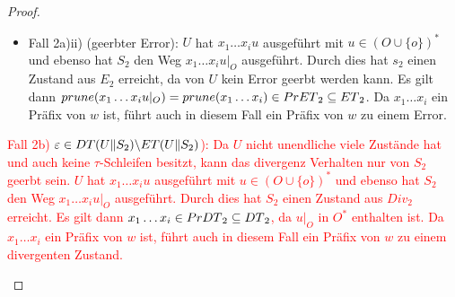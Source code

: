\begin{proof}
\begin{itemize}
\begin{itemize}
\begin{itemize}
              $q_{02} \overset{x_1\dots x_i}{\Rightarrow} q'
              \overset{x_{i+1}}{\not{\hspace{-0.1cm}\rightarrow}}$ und damit
              gilt $x_1\dots x_{i+1}\in \MIT{}_2\subseteq \ET{}_2$. Somit ist
              ein Präfix von $w$ in $\ET{}_2$ enthalten.
            \item Fall 2a)ii) (geerbter Error): $U$ hat $x_1\dots x_iu$
              ausgeführt mit $u\in (O\cup\{o\})^*$ und ebenso hat $S_2$ den
              Weg $x_1\dots x_iu|_{O}$ ausgeführt. Durch dies hat $s_2$ einen
              Zustand aus $E_2$ erreicht, da von $U$ kein Error geerbt werden
              kann. Es gilt dann $prune{}(x_1\dots x_iu|_{O})=
              prune{}(x_1\dots x_i)\in PrET{}_2\subseteq ET{}_2$. Da
              $x_1\dots x_i$ ein Präfix von $w$ ist, führt auch in diesem Fall
              ein Präfix von $w$ zu einem Error.
          \end{itemize}
        \textcolor{red}{\item Fall 2b) $\varepsilon\in DT{}(U\|S_2)\backslash ET{}(U\|S_2)$):
          Da $U$ nicht unendliche viele Zustände hat und auch keine
          $\tau$-Schleifen besitzt, kann das divergenz Verhalten nur von $S_2$
          geerbt sein. $U$ hat $x_1\dots x_iu$ ausgeführt mit $u\in (O\cup
          \{o\})^*$ und ebenso hat $S_2$ den Weg $x_1\dots x_iu|_{O}$
          ausgeführt. Durch dies hat $S_2$ einen Zustand aus $Div_2$
          erreicht. Es gilt dann $x_1\dots x_i\in PrDT{}_2\subseteq DT{}_2$,
          da $u|_{O}$ in $O^*$ enthalten ist. Da $x_1\dots x_i$ ein Präfix von
          $w$ ist, führt auch in diesem Fall ein Präfix von $w$ zu einem
        divergenten Zustand.}
      \end{itemize}
  \end{itemize}


\end{proof}
